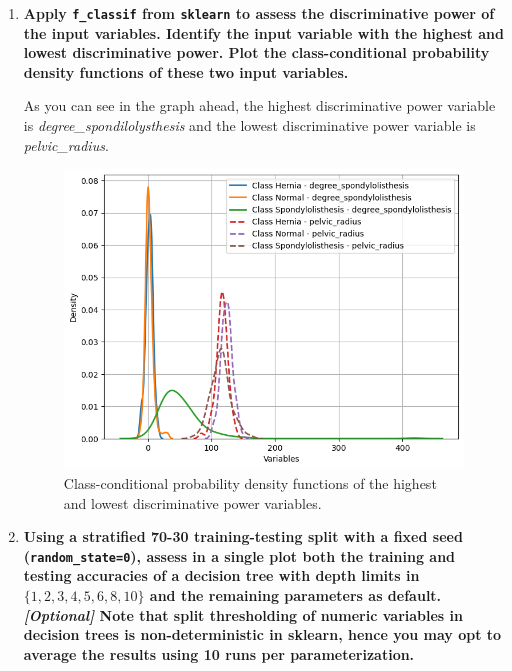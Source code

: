 \documentclass[12pt]{article}
\begin{document}
\begin{enumerate}[leftmargin=\labelsep]
    \item \textbf{Apply \texttt{f\_classif} from \texttt{sklearn} to assess the discriminative power of the input variables.
          Identify the input variable with the highest and lowest discriminative power.
          Plot the class-conditional probability density functions of these two input variables.}

          \vskip 0.3cm
          

          As you can see in the graph ahead, the highest discriminative power variable is \textit{degree\_spondilolysthesis} and
          the lowest discriminative power variable is \textit{pelvic\_radius}.

          \begin{figure}[H]
              \centering
              \includegraphics[width=12cm]{./assets/class_conditional_probability.png}
              \caption{Class-conditional probability density functions of the highest and lowest discriminative power variables.}
              \label{fig:PartII-ex1-plot}
          \end{figure}

    \item \textbf{Using a stratified 70-30 training-testing split with a fixed seed (\texttt{random\_state=0}), assess in a
          single plot both the training and testing accuracies of a decision tree with depth limits in
          $\{1,2,3,4,5,6,8,10\}$ and the remaining parameters as default.\vskip 0.05cm
          \textit{[Optional]} Note that split thresholding of numeric variables in decision trees is non-deterministic
          in sklearn, hence you may opt to average the results using 10 runs per parameterization.}


\end{enumerate}
\end{document}
